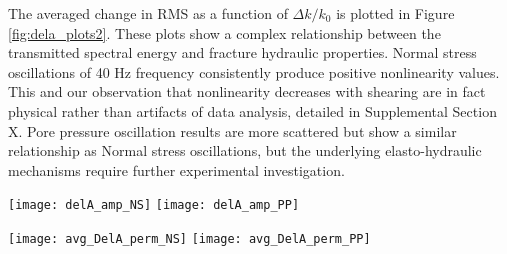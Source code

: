 The averaged change in RMS as a function of $ \Delta k/k_0 $ is plotted in Figure \ref{fig:dela_plots2}. These plots show a complex relationship between the transmitted spectral energy and fracture hydraulic properties. Normal stress oscillations of 40 Hz frequency consistently produce positive nonlinearity values. This and our observation that nonlinearity decreases with shearing are in fact physical rather than artifacts of data analysis, detailed in Supplemental Section X. Pore pressure oscillation results are more scattered but show a similar relationship as Normal stress oscillations, but the underlying elasto-hydraulic mechanisms require further experimental investigation.  




\clearpage

\begin{figure*}[ht]
	\centering
	\texttt{[image: delA\_amp\_NS]}
	\texttt{[image: delA\_amp\_PP]}
	\caption{RMS amplitude for direct-path receiver as a function of permeability change for $ \sigma_{NS} $ and $ P_P $ oscillations. Data point shapes oscillation order.  RMS amplitude decreases with oscillation amplitude and show little variation with order for experiment p4975. }
	\label{fig:delA_ns_amp}
\end{figure*}

\clearpage


\begin{figure*}[ht]
	\centering
	\texttt{[image: avg\_DelA\_perm\_NS]}
	\texttt{[image: avg\_DelA\_perm\_PP]}
	\caption{RMS amplitude averaged over all receivers as a function of permeability change for $ \sigma_{NS} $ and $ P_P $ oscillations. Data point shapes correspond to oscillation frequency and sizes to amplitude. There is a familiar trend that the average RMS amp. decreases with oscillation amplitude and frequency, except at high frequencies where there is anomalous behavior. Shearing the fracture weakens the relationship with relative permeability change.}
	\label{fig:dela_plots2}
\end{figure*}

